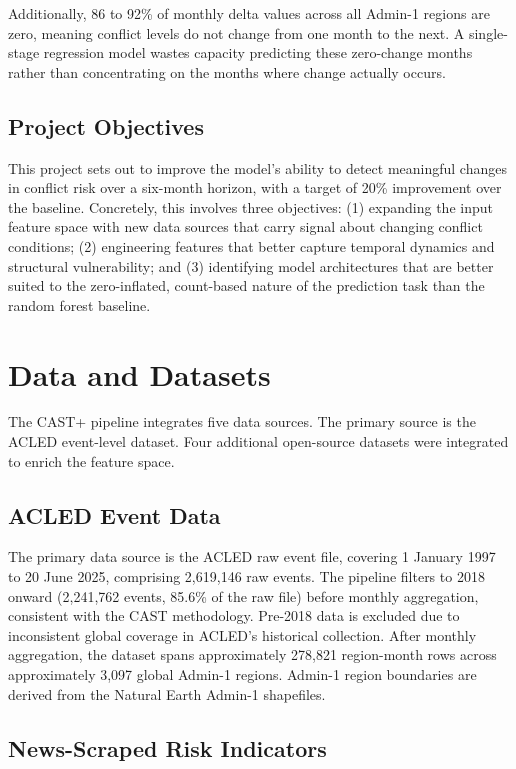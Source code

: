 \documentclass[12pt,a4paper]{article}
\begin{document}
Additionally, 86 to 92\% of monthly delta values across all Admin-1
regions are zero, meaning conflict levels do not change from one month
to the next. A single-stage regression model wastes capacity predicting
these zero-change months rather than concentrating on the months where
change actually occurs.

\subsection{Project Objectives}

This project sets out to improve the model's ability to detect meaningful
changes in conflict risk over a six-month horizon, with a target of 20\%
improvement over the baseline. Concretely, this involves three objectives:
(1) expanding the input feature space with new data sources that carry
signal about changing conflict conditions; (2) engineering features that
better capture temporal dynamics and structural vulnerability; and (3)
identifying model architectures that are better suited to the
zero-inflated, count-based nature of the prediction task than the
random forest baseline.


\section{Data and Datasets}

The CAST+ pipeline integrates five data sources. The primary source is
the ACLED event-level dataset. Four additional open-source datasets were
integrated to enrich the feature space.

\subsection{ACLED Event Data}

The primary data source is the ACLED raw event file, covering
1 January 1997 to 20 June 2025, comprising 2,619,146 raw events. The
pipeline filters to 2018 onward (2,241,762 events, 85.6\% of the raw
file) before monthly aggregation, consistent with the CAST methodology.
Pre-2018 data is excluded due to inconsistent global coverage in ACLED's
historical collection. After monthly aggregation, the dataset spans
approximately 278,821 region-month rows across approximately 3,097 global
Admin-1 regions. Admin-1 region boundaries are derived from the Natural
Earth Admin-1 shapefiles.

\subsection{News-Scraped Risk Indicators}
\end{document}
